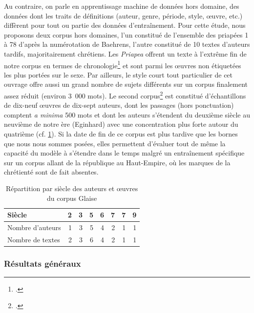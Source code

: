 Au contraire, on parle en apprentissage machine de données hors domaine, des données dont les traits de définitions (auteur, genre, période, style, œuvre, etc.) diffèrent pour tout ou partie des données d'entraînement. Pour cette étude, nous proposons deux corpus hors domaines, l'un constitué de l'ensemble des priapées 1 à 78 d'après la numérotation de Baehrens, l'autre constitué de 10 textes d'auteurs tardifs, majoritairement chrétiens. Les \textit{Priapea} offrent un texte à l'extrême fin de notre corpus en termes de chronologie\footcite{citroni_les_2008} et sont parmi les œuvres non étiquetées les plus portées sur le sexe. Par ailleurs, le style court tout particulier de cet ouvrage offre aussi un grand nombre de sujets différents sur un corpus finalement assez réduit (environ 3~000 mots). Le second corpus\footcite{glaise_2020_corpus_tardif} est constitué d'échantillons de dix-neuf œuvres de dix-sept auteurs, dont les passages (hors ponctuation) comptent \textit{a minima} 500 mots et dont les auteurs s'étendent du deuxième siècle au neuvième de notre ère (Eginhard) avec une concentration plus forte autour du quatrième (cf. \ref{corpus:glaise:dates}). Si la date de fin de ce corpus est plus tardive que les bornes que nous nous sommes posées, elles permettent d'évaluer tout de même la capacité du modèle à s'étendre dans le temps malgré un entraînement spécifique sur un corpus allant de la république au Haut-Empire, où les marques de la chrétienté sont de fait absentes.

\begin{table}[h]
\centering
\begin{tabular}{l|rrrrrrr}
\toprule
Siècle           & 2 & 3 & 5 & 6 & 7 & 7 & 9 \\ \midrule
Nombre d'auteurs & 1 & 3 & 5 & 4 & 2 & 1 & 1 \\
Nombre de textes & 2 & 3 & 6 & 4 & 2 & 1 & 1 \\ \bottomrule
\end{tabular}
\caption{Répartition par siècle des auteurs et œuvres du corpus Glaise}
\label{corpus:glaise:dates}
\end{table}

\subsubsection{Résultats généraux}

